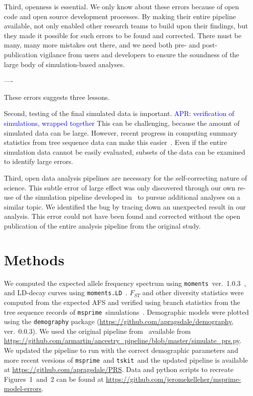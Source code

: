 \documentclass{article}
\newcommand{\msprime}[0]{\texttt{msprime}}
\newcommand{\tskit}[0]{\texttt{tskit}}
\newcommand{\aprcomment}[1]{{\textcolor{blue}{APR: #1}}}
\begin{document}
Third, openness is essential. We only know about these errors because of open code and
open source development processes. By making their entire pipeline available,
\citet{martin2017human} not only enabled other research teams to build upon their findings,
but they made it possible for such errors to be found and corrected.
There must be many, many more mistakes out there, and we need both
pre- and post-publication vigilance from users and developers to ensure the
soundness of the large body of simulation-based analyses.

----

These errors suggests three lessons.

Second, testing of the final simulated data is important. \aprcomment{verification of simulations, wrapped together}
This can be challenging, because the amount of simulated data can be large.
However, recent progress in computing summary statistics from tree
sequence data can make this easier~\citep{ralph2020efficiently}.
Even if the entire simulation data cannot be easily evaluated, subsets of the data
can be examined to identify large errors.

Third, open data analysis pipelines are necessary for the self-correcting nature of science.
This subtle error of large effect was only discovered through our own re-use of
the simulation pipeline developed in~\citet{martin2017human} to pursue
additional analyses on a similar topic. We identified the bug by tracing down an unexpected
result in our analysis. This error could not have been found and corrected without the open
publication of the entire analysis pipeline from the original study.



\section{Methods}


We computed the expected allele frequency spectrum using
\texttt{moments}~ver.~1.0.3~\citep{jouganous2017inferring}, and LD-decay curves using
\texttt{moments.LD}~\citep{ragsdale2019models}. $F_{ST}$ and other diversity statistics
were computed from the expected AFS and verified using branch statistics from the
tree sequence records of \msprime\ simulations~\citep{ralph2020efficiently}.
Demographic models were plotted using the \texttt{demography} package
(\url{https://github.com/apragsdale/demography}, ver.~0.0.3).
We used the original pipeline from~\citet{martin2017human} available from
\url{https://github.com/armartin/ancestry_pipeline/blob/master/simulate_prs.py}.
We updated the pipeline to run with the correct demographic parameters and more
recent versions of \msprime\ and \tskit\, and the updated pipeline is
available at \url{https://github.com/apragsdale/PRS}.
Data and python scripts to recreate Figures~1~and~2 can be found at
\url{https://github.com/jeromekelleher/msprime-model-errors}.
\end{document}
